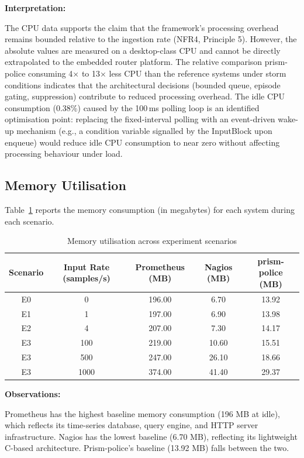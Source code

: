\textbf{Interpretation:}

The CPU data supports the claim that the framework's processing overhead remains bounded relative to the ingestion rate (NFR4, Principle 5). However, the absolute values are measured on a desktop-class CPU and cannot be directly extrapolated to the embedded router platform. The relative comparison prism-police consuming 4× to 13× less CPU than the reference systems under storm conditions indicates that the architectural decisions (bounded queue, episode gating, suppression) contribute to reduced processing overhead. The idle CPU consumption (0.38\%) caused by the 100\,ms polling loop is an identified optimisation point: replacing the fixed-interval polling with an event-driven wake-up mechanism (e.g., a condition variable signalled by the InputBlock upon enqueue) would reduce idle CPU consumption to near zero without affecting processing behaviour under load.

\subsection{Memory Utilisation}

Table~\ref{tab:memory-utilisation} reports the memory consumption (in megabytes) for each system during each scenario.

\begin{table}[htbp]
\centering
\begin{tabular}{|c|c|c|c|c|}
\hline
Scenario & Input Rate (samples/s) & Prometheus (MB) & Nagios (MB) & prism-police (MB) \\
\hline
E0 & 0 & 196.00 & 6.70 & 13.92 \\
E1 & 1 & 197.00 & 6.90 & 13.98 \\
E2 & 4 & 207.00 & 7.30 & 14.17 \\
E3 & 100 & 219.00 & 10.60 & 15.51 \\
E3 & 500 & 247.00 & 26.10 & 18.66 \\
E3 & 1000 & 374.00 & 41.40 & 29.37 \\
\hline
\end{tabular}
\caption{Memory utilisation across experiment scenarios}
\label{tab:memory-utilisation}
\end{table}

\textbf{Observations:}

Prometheus has the highest baseline memory consumption (196 MB at idle), which reflects its time-series database, query engine, and HTTP server infrastructure. Nagios has the lowest baseline (6.70 MB), reflecting its lightweight C-based architecture. Prism-police's baseline (13.92 MB) falls between the two.

